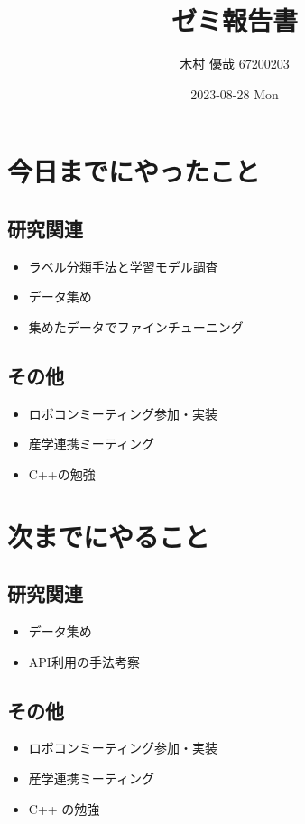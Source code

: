 \documentclass[uplatex, onecolumn, 10pt]{jsarticle}
\begin{document}
\title{\vspace{-40mm}\bf{\LARGE{ゼミ報告書}}}
\author{\vspace{-40mm}木村 優哉 67200203}
\date{2023-08-28 Mon}
\maketitle


\section{今日までにやったこと}

\subsection*{研究関連}
\begin{itemize}
	\item ラベル分類手法と学習モデル調査
	\item データ集め
	\item 集めたデータでファインチューニング
\end{itemize}

\subsection*{その他}
\begin{itemize}
	\item ロボコンミーティング参加・実装
	\item 産学連携ミーティング
	\item C++の勉強
\end{itemize}


\section{次までにやること}

\subsection*{研究関連}
\begin{itemize}
	\item データ集め
	\item API利用の手法考察
\end{itemize}

\subsection*{その他}
\begin{itemize}
	\item ロボコンミーティング参加・実装
	\item 産学連携ミーティング
	\item C++ の勉強
\end{itemize}
\end{document}
